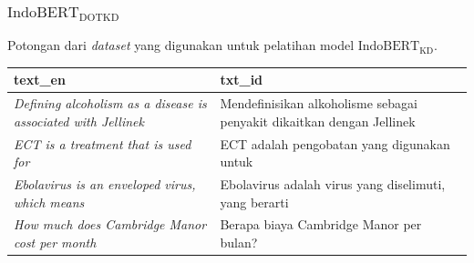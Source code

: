 \documentclass[10pt]{beamer}
\newcommand{\f}[1]{\textit{#1}}
\begin{document}
\begin{frame}
    \frametitle{$\text{IndoBERT}_{\text{DOTKD}}$}
    Potongan dari \f{dataset} yang digunakan untuk pelatihan model $\text{IndoBERT}_{\text{KD}}$.
    \begin{table}[!ht]
        \centering
        \small
        \begin{tabular}{|p{4cm}|p{4cm}|}
            \hline
            \textbf{text\_en} & \textbf{txt\_id} \\
            \hline
            \f{Defining alcoholism as a disease is associated with Jellinek} & Mendefinisikan alkoholisme sebagai penyakit dikaitkan dengan Jellinek \\
            \hline
            \f{ECT is a treatment that is used for} & ECT adalah pengobatan yang digunakan untuk \\
            \hline
            \f{Ebolavirus is an enveloped virus, which means} & Ebolavirus adalah virus yang diselimuti, yang berarti \\
            \hline
            \f{How much does Cambridge Manor cost per month} & Berapa biaya Cambridge Manor per bulan? \\
            \hline
        \end{tabular}
    \end{table}
\end{frame}
\end{document}
